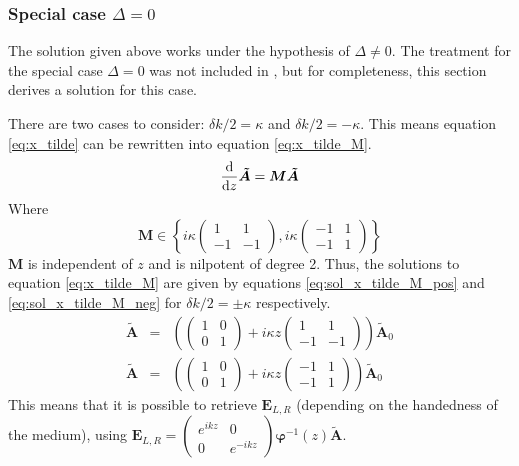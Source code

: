 \subsubsection{Special case $\Delta=0$}
\label{sec:special_case}
The solution given above works under the hypothesis of $\Delta\neq0$. The treatment for the special case $\Delta=0$ was not included in \cite{mccall_photonics_2020}, but for completeness, this section derives a solution for this case.

There are two cases to consider: $\delta k/2 = \kappa$ and $\delta k/2 = -\kappa$. This means equation \ref{eq:x_tilde} can be rewritten into equation \ref{eq:x_tilde_M}.
\begin{equation}
	\dv{z}\bm{\tilde{A}} = \bm{M}\bm{\tilde{A}} \label{eq:x_tilde_M}
\end{equation}
Where
\begin{equation}
	\bm{M} \in \left\{i\kappa\begin{pmatrix}
	1 & 1\\-1 & -1
	\end{pmatrix},i\kappa\begin{pmatrix}
	-1 & 1\\-1 & 1
	\end{pmatrix}\right\}
\end{equation}
%
$\bm{M}$ is independent of $z$ and is nilpotent of degree 2. Thus, the solutions to equation \ref{eq:x_tilde_M} are given by equations \ref{eq:sol_x_tilde_M_pos} and \ref{eq:sol_x_tilde_M_neg} for $\delta k/2 = \pm\kappa$ respectively.
\begin{eqnarray}
\bm{\tilde{A}} &=&\left(\begin{pmatrix}
1 & 0\\0 & 1
\end{pmatrix}+i\kappa z\begin{pmatrix}
1 & 1\\-1 & -1
\end{pmatrix}\right)\bm{\tilde{A}}_0\label{eq:sol_x_tilde_M_pos}\\
\bm{\tilde{A}} &=&\left(\begin{pmatrix}
1 & 0\\0 & 1
\end{pmatrix}+i\kappa z\begin{pmatrix}
-1 & 1\\-1 & 1
\end{pmatrix}\right)\bm{\tilde{A}}_0\label{eq:sol_x_tilde_M_neg}
\end{eqnarray}
%
This means that it is possible to retrieve $\bm{E}_{L,R}$ (depending on the handedness of the medium), using $\bm{E}_{L,R}=\begin{pmatrix}e^{ikz}&0\\0&e^{-ikz}\end{pmatrix}\bm{\varphi}^{-1}(z)\bm{\tilde{A}}$.
